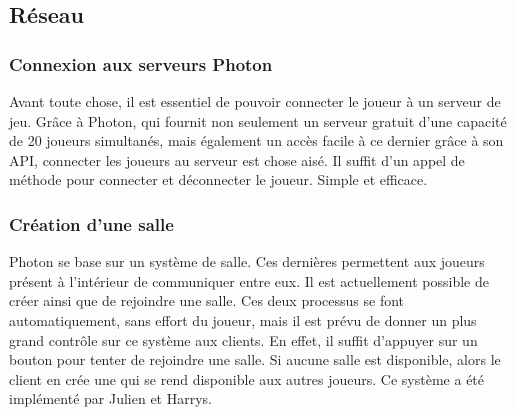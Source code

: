 \subsection{Réseau}

    \subsubsection{Connexion aux serveurs Photon}
        Avant toute chose, il est essentiel de pouvoir connecter le joueur à un serveur de jeu.
        Grâce à Photon, qui fournit non seulement un serveur gratuit d'une capacité de 20 joueurs simultanés,
        mais également un accès facile à ce dernier grâce à son API, connecter les joueurs au serveur est chose
         aisé. Il suffit d'un appel de méthode pour connecter et déconnecter le joueur. Simple et efficace.

    \subsubsection{Création d'une salle}
        Photon se base sur un système de salle. Ces dernières permettent aux joueurs présent à l'intérieur de communiquer entre eux.
        Il est actuellement possible de créer ainsi que de rejoindre une salle. Ces deux processus se font automatiquement, sans effort du joueur,
        mais il est prévu de donner un plus grand contrôle sur ce système aux clients.
        En effet, il suffit d'appuyer sur un bouton pour tenter de rejoindre une salle.
        Si aucune salle est disponible, alors le client en crée une qui se rend disponible aux autres joueurs.
        Ce système a été implémenté par Julien et Harrys.

